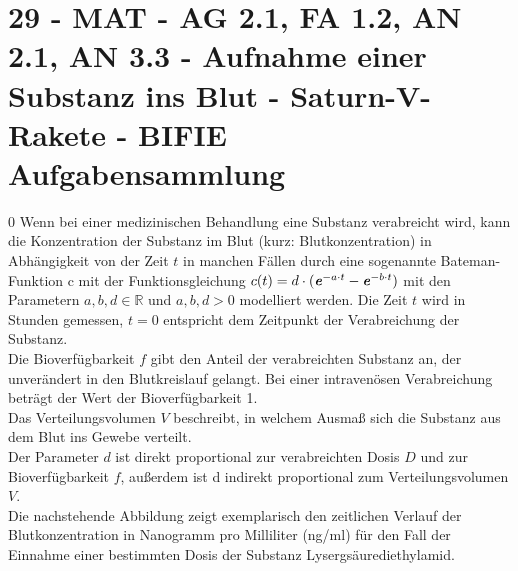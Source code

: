 \section{29 - MAT - AG 2.1, FA 1.2, AN 2.1, AN 3.3 - Aufnahme einer Substanz ins Blut - Saturn-V-Rakete - BIFIE Aufgabensammlung}

\begin{langesbeispiel} \item[0] %
				Wenn bei einer medizinischen Behandlung eine Substanz verabreicht wird, kann die Konzentration der Substanz im Blut (kurz: Blutkonzentration) in Abhängigkeit von der Zeit $t$ in manchen Fällen durch eine sogenannte Bateman-Funktion c mit der Funktionsgleichung $c(t)=d\cdot (\textbf{\textit{e}}^{-a\cdot t}-\textbf{\textit{e}}^{-b\cdot t})$ mit den Parametern $a,b,d\in\mathbb{R}$ und $a,b,d>0$ modelliert werden. Die Zeit $t$ wird in Stunden gemessen, $t=0$ entspricht dem Zeitpunkt der Verabreichung der Substanz.\\
Die Bioverfügbarkeit $f$ gibt den Anteil der verabreichten Substanz an, der unverändert in den
Blutkreislauf gelangt. Bei einer intravenösen Verabreichung beträgt der Wert der Bioverfügbarkeit 1.\\
Das Verteilungsvolumen $V$ beschreibt, in welchem Ausmaß sich die Substanz aus dem Blut ins Gewebe verteilt.\\
Der Parameter $d$ ist direkt proportional zur verabreichten Dosis $D$ und zur Bioverfügbarkeit $f$, außerdem ist d indirekt proportional zum Verteilungsvolumen $V$.\\
Die nachstehende Abbildung zeigt exemplarisch den zeitlichen Verlauf der Blutkonzentration in
Nanogramm pro Milliliter (ng/ml) für den Fall der Einnahme einer bestimmten Dosis der Substanz Lysergsäurediethylamid.

\begin{center}
\end{center}


\end{langesbeispiel}
